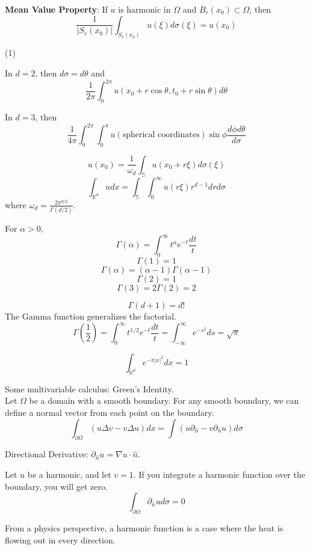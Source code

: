 \documentclass[12pt]{article}
\begin{document}
\noindent \textbf{Mean Value Property}: If $u$ is harmonic in $\Omega$ and $\overline{B}_r(x_0) \subset \Omega$, then
$$\frac{1}{\vert S_r(x_0)\vert} \int_{S_r(x_0)} u(\xi) d\sigma(\xi) = u(x_0)$$

(1)

In $d=2$, then $d\sigma = d\theta$ and
$$\frac{1}{2\pi}\int^{2\pi}_0 u(x_0 + r \cos\theta, t_0 + r\sin \theta)d \theta$$


In $d=3$, then 
$$\frac{1}{4\pi}\int^{2\pi}_0\int^\pi_0 u(\text{spherical coordinates}) \sin\phi \frac{d\phi d \theta}{d\sigma}$$

$$u(x_0) = \frac{1}{\omega_d} \int_{\mathbb{S}} u(x_0 + r \xi) d\sigma(\xi)$$
$$\int_{\mathbb{R}^d} u dx = \int_{\mathbb{S}}\int^\infty_0 u (r \xi)r^{d-1} dr d\sigma$$
where $\omega_d = \frac{2\pi^{d/2}}{\Gamma(d/2)}$. 

For $\alpha>0$, $$\Gamma(\alpha) = \int^\infty_0 t^\alpha e^{-t} \frac{dt}{t}$$
$$\Gamma(1)=1$$
$$\Gamma(\alpha) = (\alpha-1)\Gamma(\alpha-1)$$
$$\Gamma(2) = 1$$ 
$$\Gamma(3) = 2\Gamma(2) = 2$$

$$\Gamma(d+1) = d!$$
The Gamma function generalizes the factorial. 
$$\Gamma(\frac{1}{2}) = \int^\infty_0 t^{1/2} e^{-t} \frac{dt}{t} = \int^\infty_{-\infty} e^{-s^2} ds = \sqrt{\pi}$$

$$\int_{\mathbb{R}^d} e^{-\pi \vert x \vert^2} dx = 1$$

\noindent Some multivariable calculus: Green's Identity. \\
\noindent Let $\Omega$ be a domain with a smooth boundary. For any smooth boundary, we can define a normal vector from each point on the boundary. 
$$ \int_{\partial\Omega} (u\Delta v - v \Delta u) dx = \int (u \partial_{\hat{n}} - v \partial_{\hat{n}}u)  d\sigma $$

\noindent Directional Derivative: $\partial_{\hat{n}} u = \nabla u \cdot \hat{n}$.

\noindent Let $u$ be a harmonic, and let $v=1$. If you integrate a harmonic function over the boundary, you will get zero.
$$ \int_{\partial\Omega} \partial_{\hat{n}}u d\sigma = 0$$

\noindent From a physics perspective, a harmonic function is a case where the heat is flowing out in every direction. 
\end{document}
